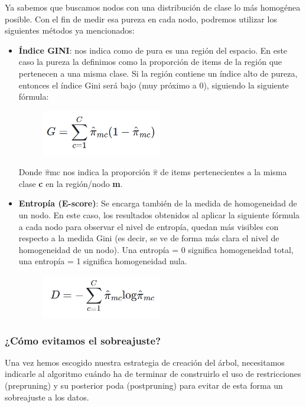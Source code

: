 Ya sabemos que buscamos nodos con una distribución de clase lo más homogénea posible. Con el fin de medir esa pureza en cada nodo, podremos utilizar los siguientes métodos ya mencionados:
\begin{itemize}
	\item \textbf{Índice GINI}: nos indica como de pura es una región del espacio\cite{ref6}. En este caso la pureza la definimos como la proporción de items de la región que pertenecen a una misma clase. Si la región contiene un índice
	alto de pureza, entonces el índice Gini será bajo (muy próximo a 0), siguiendo la siguiente fórmula:
	\begin{figure}[H]
		\centering
		\includegraphics[width=0.5\textwidth]{imagenes/gini} 
	\end{figure}
	Donde $\widehat{\pi}$mc nos indica la proporción \textbf{$\widehat{\pi}$} de items pertenecientes a la misma clase \textbf{c} en la región/nodo \textbf{m}.
	\item \textbf{Entropía (E-score)}: Se encarga también de la medida de homogeneidad de un nodo\cite{ref6}. En este caso, los resultados obtenidos al aplicar la siguiente fórmula a cada nodo para observar el nivel de entropía, quedan más visibles con respecto a la medida Gini (es decir, se ve de forma más clara el nivel de homogeneidad de un nodo). Una entropía = 0 significa homogeneidad total, una entropía = 1 significa homogeneidad nula.
	\begin{figure}[H]
		\centering
		\includegraphics[width=0.5\textwidth]{imagenes/entropia} 
	\end{figure}
\end{itemize}

\subsubsection{¿Cómo evitamos el sobreajuste?}

Una vez hemos escogido nuestra estrategia de creación del árbol, necesitamos indicarle al algoritmo cuándo ha de terminar de construirlo el uso de restricciones (prepruning) y su posterior poda (postpruning) para evitar de esta forma un sobreajuste a los datos.\\

